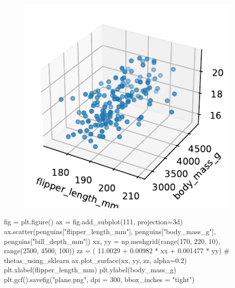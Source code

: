 \documentclass[
  letterpaper,
  DIV=11,
  numbers=noendperiod]{scrreprt}
\newenvironment{Shaded}{\begin{snugshade}}{\end{snugshade}}
\newcommand{\BuiltInTok}[1]{\textcolor[rgb]{0.00,0.23,0.31}{#1}}
\newcommand{\CommentTok}[1]{\textcolor[rgb]{0.37,0.37,0.37}{#1}}
\newcommand{\DecValTok}[1]{\textcolor[rgb]{0.68,0.00,0.00}{#1}}
\newcommand{\FloatTok}[1]{\textcolor[rgb]{0.68,0.00,0.00}{#1}}
\newcommand{\NormalTok}[1]{\textcolor[rgb]{0.00,0.23,0.31}{#1}}
\newcommand{\OperatorTok}[1]{\textcolor[rgb]{0.37,0.37,0.37}{#1}}
\newcommand{\StringTok}[1]{\textcolor[rgb]{0.13,0.47,0.30}{#1}}
\begin{document}
\begin{figure}[H]

{\centering \includegraphics{gradient_descent/gradient_descent_files/figure-pdf/cell-19-output-2.pdf}

}

\end{figure}

\begin{Shaded}
\begin{Highlighting}[]
\NormalTok{fig }\OperatorTok{=}\NormalTok{ plt.figure()}
\NormalTok{ax }\OperatorTok{=}\NormalTok{ fig.add\_subplot(}\DecValTok{111}\NormalTok{, projection}\OperatorTok{=}\StringTok{\textquotesingle{}3d\textquotesingle{}}\NormalTok{)}
\NormalTok{ax.scatter(penguins[}\StringTok{"flipper\_length\_mm"}\NormalTok{], penguins[}\StringTok{"body\_mass\_g"}\NormalTok{], penguins[}\StringTok{"bill\_depth\_mm"}\NormalTok{])}
\NormalTok{xx, yy }\OperatorTok{=}\NormalTok{ np.meshgrid(}\BuiltInTok{range}\NormalTok{(}\DecValTok{170}\NormalTok{, }\DecValTok{220}\NormalTok{, }\DecValTok{10}\NormalTok{), }\BuiltInTok{range}\NormalTok{(}\DecValTok{2500}\NormalTok{, }\DecValTok{4500}\NormalTok{, }\DecValTok{100}\NormalTok{))}
\NormalTok{zz }\OperatorTok{=}\NormalTok{ ( }\FloatTok{11.0029} \OperatorTok{+} \FloatTok{0.00982} \OperatorTok{*}\NormalTok{ xx }\OperatorTok{+} \FloatTok{0.001477} \OperatorTok{*}\NormalTok{ yy) }\CommentTok{\# thetas\_using\_sklearn}
\NormalTok{ax.plot\_surface(xx, yy, zz, alpha}\OperatorTok{=}\FloatTok{0.2}\NormalTok{)}
\NormalTok{plt.xlabel(}\StringTok{\textquotesingle{}flipper\_length\_mm\textquotesingle{}}\NormalTok{)}
\NormalTok{plt.ylabel(}\StringTok{\textquotesingle{}body\_mass\_g\textquotesingle{}}\NormalTok{)}
\NormalTok{plt.gcf().savefig(}\StringTok{"plane.png"}\NormalTok{, dpi }\OperatorTok{=} \DecValTok{300}\NormalTok{, bbox\_inches }\OperatorTok{=} \StringTok{"tight"}\NormalTok{)}
\end{Highlighting}
\end{Shaded}
\end{document}
